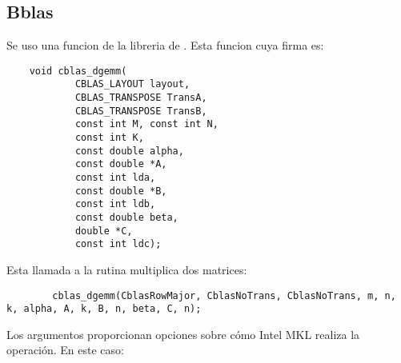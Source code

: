 \subsection{Bblas}
    Se uso una funcion de la libreria  de . Esta funcion
    cuya firma es:
    \lstset{language=C, numbers=left, tabsize=2, escapeinside=||}
    \begin{lstlisting}
    void cblas_dgemm(
            CBLAS_LAYOUT layout,
            CBLAS_TRANSPOSE TransA,
            CBLAS_TRANSPOSE TransB,
            const int M, const int N,
            const int K,
            const double alpha,
            const double *A,
            const int lda,
            const double *B,
            const int ldb,
            const double beta,
            double *C,
            const int ldc);
    \end{lstlisting}
    Esta llamada a la rutina  multiplica dos matrices:
    \begin{lstlisting}
        cblas_dgemm(CblasRowMajor, CblasNoTrans, CblasNoTrans, m, n, k, alpha, A, k, B, n, beta, C, n);
    \end{lstlisting}
    Los argumentos proporcionan opciones sobre cómo Intel MKL realiza la
    operación. En este caso: \\
